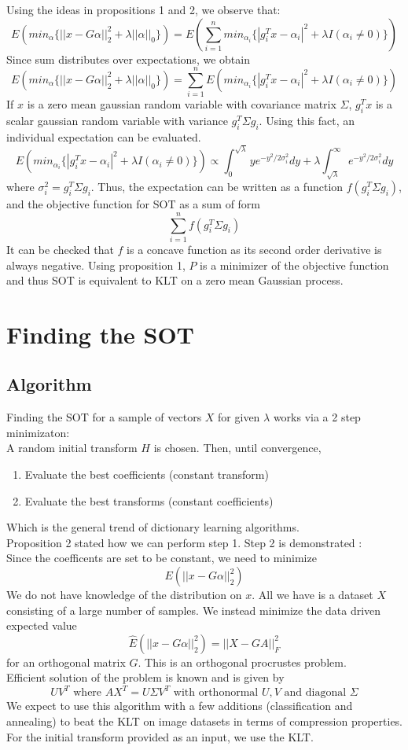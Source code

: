 \documentclass{article}
\theoremstyle{remark}
\begin{document}
Using the ideas in propositions 1 and 2, we observe that:
$$E(min_\alpha \{||x-G\alpha||_2^2 + \lambda||\alpha||_0\}) = E(\sum_{i=1}^n min_{\alpha_i} \{ |g_i^Tx - \alpha_i|^2 + \lambda I(\alpha_i \neq 0)\})$$
Since sum distributes over expectations, we obtain
$$E(min_\alpha \{||x-G\alpha||_2^2 + \lambda||\alpha||_0\}) = \sum_{i=1}^n E( min_{\alpha_i} \{ |g_i^Tx - \alpha_i|^2 + \lambda I(\alpha_i \neq 0)\})$$
If $x$ is a zero mean gaussian random variable with covariance matrix $\Sigma$, $g_i^Tx$ is a scalar gaussian random variable with variance $g_i^T\Sigma g_i$. Using this fact, an individual expectation can be evaluated.
$$E( min_{\alpha_i} \{ |g_i^Tx - \alpha_i|^2 + \lambda I(\alpha_i \neq 0)\} ) \propto \int_0^{\sqrt{\lambda}} y e^{-y^2/2\sigma_i^2} dy + \lambda \int_{\sqrt{\lambda}}^{\infty} e^{-y^2/2\sigma_i^2}dy$$
where $\sigma_i^2 = g_i^T \Sigma g_i$. Thus, the expectation can be written as a function $f(g_i^T\Sigma g_i)$, and the objective function for SOT as a sum of form
$$\sum_{i=1}^n f(g_i^T\Sigma g_i)$$
It can be checked that $f$ is a concave function as its second order derivative is always negative. Using proposition 1, $P$ is a minimizer of the objective function and thus SOT is equivalent to KLT on a zero mean Gaussian process.
\newpage

\section*{Finding the SOT}
\subsection*{Algorithm}
Finding the SOT for a sample of vectors $X$ for given $\lambda$ works via a 2 step minimizaton:\\[1mm]
A random initial transform $H$ is chosen. Then, until convergence,
\begin{enumerate}
\item Evaluate the best coefficients (constant transform)
\item Evaluate the best transforms (constant coefficients)
\end{enumerate}
Which is the general trend of dictionary learning algorithms.\\[2mm]
Proposition 2 stated how we can perform step 1. Step 2 is demonstrated :\\[1mm]
Since the coefficents are set to be constant, we need to minimize 
$$E( ||x - G\alpha||_2^2)$$
We do not have knowledge of the distribution on $x$. All we have is a dataset $X$ consisting of a large number of samples. We instead minimize the data driven expected value
$$\hat{E} (||x-G\alpha||_2^2) = ||X - GA||_F^2$$
for an orthogonal matrix $G$. This is an orthogonal procrustes problem.\\[1mm]
Efficient solution of the problem is known and is given by
$$UV^T \text{ where } AX^T = U\Sigma V^T \text{ with orthonormal } U,V \text{ and diagonal } \Sigma$$
We expect to use this algorithm with a few additions (classification and annealing) to beat the KLT on image datasets in terms of compression properties.\\[1mm]
For the initial transform provided as an input, we use the KLT.
\end{document}
